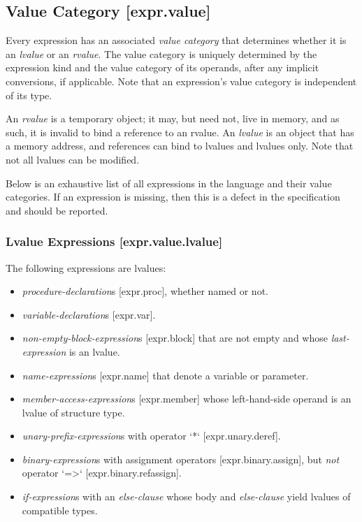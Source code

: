 \documentclass[a4paper, 12pt, oneside, final]{article}
\makeatletter
\def\section{\@startsection{section}{1}{0mm}{-3.5ex}{3.5ex}{\normalfont\fontsize{24pt}{36pt}\selectfont}}
\def\sref[#1]{[#1]}
\makeatother
\begin{document}
\section{Expressions [expr]}
\subsection{Value Category [expr.value]}
Every expression has an associated \emph{value category} that determines whether it is an \emph{lvalue} or an \emph{rvalue}. The
value category is uniquely determined by the expression kind and the value category of its operands, after any implicit
conversions, if applicable. Note that an expression’s value category is independent of its type.

An \emph{rvalue} is a temporary object; it may, but need not, live in memory, and as such,
it is invalid to bind a reference to an rvalue. An \emph{lvalue} is an object that has a memory address, and references
can bind to lvalues and lvalues only. Note that not all lvalues can be modified.

Below is an exhaustive list of all expressions in the language and their value categories. If an expression is missing, then
this is a defect in the specification and should be reported.

\subsubsection{Lvalue Expressions [expr.value.lvalue]}
The following expressions are lvalues:
\begin{itemize}
\item \emph{procedure-declaration}s \sref[expr.proc], whether named or not.
\item \emph{variable-declaration}s \sref[expr.var].
\item \emph{non-empty-block-expression}s \sref[expr.block] that are not empty and whose \emph{last-expression} is an lvalue.
\item \emph{name-expression}s \sref[expr.name] that denote a variable or parameter.
\item \emph{member-access-expression}s \sref[expr.member] whose left-hand-side operand is an lvalue of structure type.
\item \emph{unary-prefix-expression}s with operator `*` \sref[expr.unary.deref].
\item \emph{binary-expression}s with assignment operators \sref[expr.binary.assign], but \emph{not} operator `=>` \sref[expr.binary.refassign].
\item \emph{if-expression}s with an \emph{else-clause} whose body and \emph{else-clause} yield lvalues of compatible types.
\end{itemize}
\end{document}
